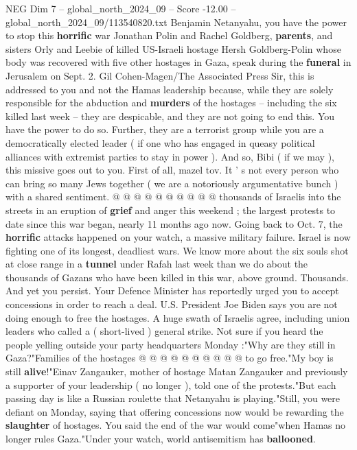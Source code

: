 \begin{textsample}{NEG Dim 7 – global\_north\_2024\_09 – Score -12.00 – global\_north\_2024\_09/113540820.txt}  \label{ex:f7_neg_009}
Benjamin Netanyahu, you have the power to stop this \textbf{horrific} war Jonathan Polin and Rachel Goldberg, \textbf{parents}, and sisters Orly and Leebie of killed US-Israeli hostage Hersh Goldberg-Polin whose body was recovered with five other hostages in Gaza, speak during the \textbf{funeral} in Jerusalem on Sept. 2.
Gil Cohen-Magen/The Associated Press Sir, this is addressed to you and not the Hamas leadership because, while they are solely responsible for the abduction and \textbf{murders} of the hostages -- including the six killed last week -- they are despicable, and they are not going to end this.
You have the power to do so.
Further, they are a terrorist group while you are a democratically elected leader ( if one who has engaged in queasy political alliances with extremist parties to stay in power ).
And so, Bibi ( if we may ), this missive goes out to you.
First of all, mazel tov.
It ' s not every person who can bring so many Jews together ( we are a notoriously argumentative bunch ) with a shared sentiment. @ @ @ @ @ @ @ @ @ @ thousands of Israelis into the streets in an eruption of \textbf{grief} and anger this weekend ; the largest protests to date since this war began, nearly 11 months ago now.
Going back to Oct. 7, the \textbf{horrific} attacks happened on your watch, a massive military failure.
Israel is now fighting one of its longest, deadliest wars.
We know more about the six souls shot at close range in a \textbf{tunnel} under Rafah last week than we do about the thousands of Gazans who have been killed in this war, above ground.
Thousands.
And yet you persist.
Your Defence Minister has reportedly urged you to accept concessions in order to reach a deal.
U.S.
President Joe Biden says you are not doing enough to free the hostages.
A huge swath of Israelis agree, including union leaders who called a ( short-lived ) general strike.
Not sure if you heard the people yelling outside your party headquarters Monday :"Why are they still in Gaza?"Families of the hostages @ @ @ @ @ @ @ @ @ @ to go free."My boy is still \textbf{alive}!"Einav Zangauker, mother of hostage Matan Zangauker and previously a supporter of your leadership ( no longer ), told one of the protests."But each passing day is like a Russian roulette that Netanyahu is playing."Still, you were defiant on Monday, saying that offering concessions now would be rewarding the \textbf{slaughter} of hostages.
You said the end of the war would come"when Hamas no longer rules Gaza."Under your watch, world antisemitism has \textbf{ballooned}.

\end{textsample}
